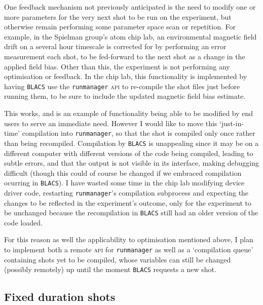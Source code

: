 One feedback mechanism not previously anticipated is the need to modify one or more parameters for the very next shot to be run on the experiment, but otherwise remain performing some parameter space scan or repetition. For example, in the Spielman group's atom chip lab, an environmental magnetic field drift on a several hour timescale is corrected for by performing an error measurement each shot, to be fed-forward to the next shot as a change in the applied field bias. Other than this, the experiment is not performing any optimisation or feedback. In the chip lab, this functionality is implemented by having \texttt{BLACS} use the \texttt{runmanager} \textsc{api} to re-compile the shot files just before running them, to be sure to include the updated magnetic field bias estimate. 

This works, and is an example of functionality being able to be modified by end users to serve an immediate need. However I would like to move this `just-in-time' compilation into \texttt{runmanager}, so that the shot is compiled only once rather than being recompiled. Compilation by \texttt{BLACS} is unappealing since it may be on a different computer with different versions of the code being compiled, leading to subtle errors, and that the output is not visible in its interface, making debugging difficult (though this could of course be changed if we embraced compilation ocurring in \texttt{BLACS}). I have wasted some time in the chip lab modifying device driver code, restarting \texttt{runmanager}'s compilation subprocess  and expecting the changes to be reflected in the experiment's outcome, only for the experiment to be unchanged because the recompilation in \texttt{BLACS} still had an older version of the code loaded.

For this reason as well the applicability to optimisation mentioned above, I plan to implement both a remote \textsc{api} for \texttt{runmanager} as well as a `compilation queue' containing shots yet to be compiled, whose variables can still be changed (possibly remotely) up until the moment \texttt{BLACS} requests a new shot.

\subsection{Fixed duration shots}

